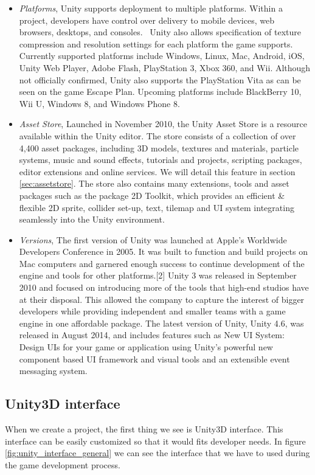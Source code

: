 \begin{itemize}
\item \textit{Platforms}, Unity supports deployment to multiple platforms. Within a project, developers
have control over delivery to mobile devices, web browsers, desktops, and consoles.~\cite{unitypress2}
Unity also allows specification of texture compression and resolution settings for each platform the game supports.~\cite{unitypress2}
Currently supported platforms include Windows, Linux, Mac, Android, iOS, Unity Web Player, Adobe Flash, PlayStation 3, Xbox 360, and Wii. Although not officially confirmed, Unity also supports the PlayStation Vita as can be seen on the game Escape Plan. Upcoming platforms include BlackBerry 10, Wii U, Windows 8, and Windows Phone 8.
\item \textit{Asset Store}, Launched in November 2010, the Unity Asset Store is a resource available
within the Unity editor. The store consists of a collection of over 4,400 asset packages, including 3D models, textures and materials, particle systems, music and sound effects, tutorials and projects, scripting packages, editor extensions and online services. We will detail this feature in section \ref{sec:assetstore}. The store also contains many extensions, tools and asset packages such as the package 2D Toolkit, which provides an efficient \& flexible 2D sprite, collider set-up, text, tilemap and UI system integrating seamlessly into the Unity environment.
\item \textit{Versions}, The first version of Unity was launched at Apple’s Worldwide Developers Conference in 2005. It was built to function and build projects on Mac computers and garnered enough success to continue development of the engine and tools for other platforms.[2] Unity 3 was released in September 2010 and focused on introducing more of the tools that high-end studios have at their disposal. This allowed the company to capture the interest of bigger developers while providing independent and smaller teams with a game engine in one affordable package. The latest version of Unity, Unity 4.6, was released in August 2014, and includes features such as New UI System: Design UIs for your game or application using Unity's powerful new component based UI framework and visual tools and an extensible event messaging system.
\end{itemize}

\subsection{Unity3D interface}
\label{subsec:unityinterface}
When we create a project, the first thing we see is Unity3D interface. This interface can be easily customized so that it would fits developer needs. In figure \ref{fig:unity_interface_general} we can see the interface that we have to used during the game development process.

